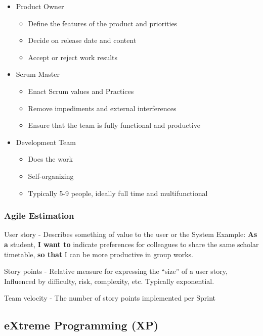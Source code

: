 \documentclass[../ESOF_notes.tex]{subfiles}
\begin{document}
\begin{itemize}
    \item Product Owner
    \begin{itemize}
        \item Define the features of the product and priorities
        \item Decide on release date and content
        \item Accept or reject work results
    \end{itemize}

    \item Scrum Master
    \begin{itemize}
        \item Enact Scrum values and Practices
        \item Remove impediments and external interferences
        \item Ensure that the team is fully functional and productive
    \end{itemize}
    
    \item Development Team
    \begin{itemize}
        \item Does the work
        \item Self-organizing
        \item Typically 5-9 people, ideally full time and multifunctional
    \end{itemize}
\end{itemize}

\subsubsection{Agile Estimation}

User story - Describes something of value to the user or the System
Example: \textbf{As a} student, \textbf{I want to} indicate preferences for colleagues to share
the same scholar timetable, \textbf{so that} I can be more productive in group works.

Story points - Relative measure for expressing the “size” of a user story, Influenced by difficulty, risk, complexity, etc.
Typically exponential.

Team velocity - The number of story points implemented per Sprint

\subsection{eXtreme Programming (XP)}
\end{document}
